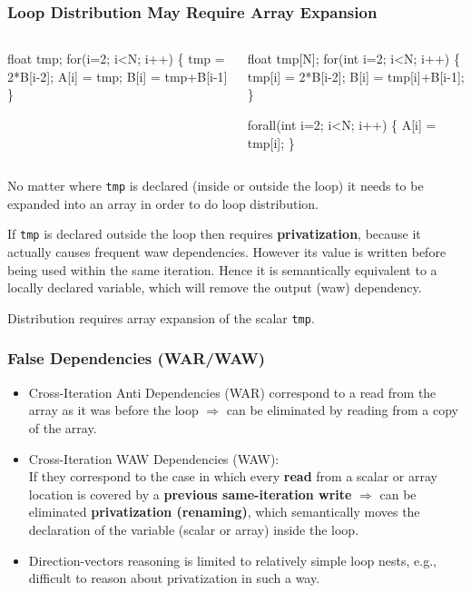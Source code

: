 \documentclass{beamer}
\renewcommand{\emph}[1]{\textcolor{CosGreen}{ #1}}
\newcommand{\emp}[1]{\textcolor{DikuRed}{ #1}}
\begin{document}
\begin{frame}[fragile,t]
  \frametitle{Loop Distribution May Require Array Expansion} 

\begin{columns}
\begin{colorcode}[fontsize=\scriptsize]
  float tmp;
  for(i=2; i<N; i++) \{
    \emp{tmp} = 2*B[i-2]; 
    A[i] = tmp;
    B[i] = tmp+B[i-1]
  \}
\end{colorcode}
\begin{colorcode}[fontsize=\scriptsize]
  \emph{float tmp[N]};
  for(int i=2; i<N; i++) \{
    tmp[i] = 2*B[i-2]; 
    B[i] = tmp[i]+B[i-1];
  \}

  \emph{forall(int i=2; i<N; i++)} \{
    A[i] = tmp[i];
  \}
\end{colorcode}
\end{columns}
\bigskip

No matter where {\tt tmp} is declared (inside or outside
the loop) it needs to be expanded into an array in order
to do loop distribution.\bigskip

If {\tt tmp} is declared outside the loop then requires \emp{\bf privatization}, \pause
because it actually causes frequent {\sc waw} dependencies.
However its value is written before being used within the same iteration.
Hence it is semantically equivalent to a locally declared variable,
which will remove the output ({\sc waw}) dependency.\bigskip

Distribution requires array expansion of the scalar {\tt tmp}.

\end{frame}

\begin{frame}[fragile,t]
  \frametitle{False Dependencies (WAR/WAW)} 

\begin{itemize}
    \item \emp{Cross-Iteration Anti Dependencies (WAR)} 
        correspond to a read from the array as it was 
        before the loop $\Rightarrow$ can be eliminated
        by reading from a copy of the array.\bigskip

    \item \emp{Cross-Iteration WAW Dependencies (WAW)}:\\
        If they correspond to the case in which every \emp{\bf read} from
        a scalar or array location is covered by a \emp{\bf previous same-iteration write}
        $\Rightarrow$ can be eliminated \emph{\bf privatization (renaming)},
        which semantically moves the declaration of the variable (scalar or array) 
        inside the loop.\bigskip

    \item Direction-vectors reasoning is limited to relatively
        simple loop nests, e.g., difficult to reason about 
        privatization in such a way.
\end  {itemize}
\end{frame}
\end{document}
